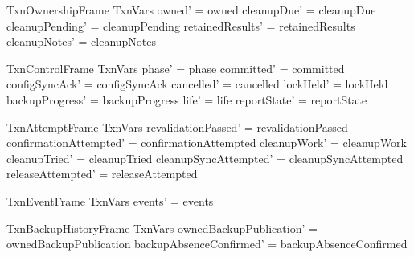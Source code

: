 \documentclass{article}
\begin{document}
\begin{schema}{TxnOwnershipFrame}
	\Delta TxnVars
	\where
	owned' = owned \land cleanupDue' = cleanupDue \land
	cleanupPending' = cleanupPending \land retainedResults' = retainedResults \land
	cleanupNotes' = cleanupNotes
\end{schema}

\begin{schema}{TxnControlFrame}
	\Delta TxnVars
	\where
	phase' = phase \land committed' = committed \land
	configSyncAck' = configSyncAck \land cancelled' = cancelled \land
	lockHeld' = lockHeld \land backupProgress' = backupProgress \land
	life' = life \land reportState' = reportState
\end{schema}

\begin{schema}{TxnAttemptFrame}
	\Delta TxnVars
	\where
	revalidationPassed' = revalidationPassed \land
	confirmationAttempted' = confirmationAttempted \land
	cleanupWork' = cleanupWork \land cleanupTried' = cleanupTried \land
	cleanupSyncAttempted' = cleanupSyncAttempted \land
	releaseAttempted' = releaseAttempted
\end{schema}

\begin{schema}{TxnEventFrame}
	\Delta TxnVars
	\where events' = events
\end{schema}

\begin{schema}{TxnBackupHistoryFrame}
	\Delta TxnVars
	\where
	ownedBackupPublication' = ownedBackupPublication \land
	backupAbsenceConfirmed' = backupAbsenceConfirmed
\end{schema}
\end{document}
